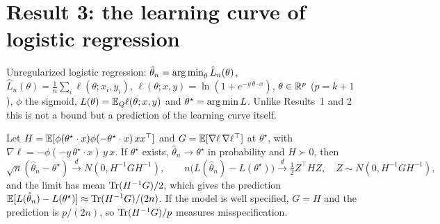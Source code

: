 \section{Result 3: the learning curve of logistic regression}
\label{sec:result-3}

Unregularized logistic regression: $\hat\theta_n=\operatorname*{arg\,min}_\theta\hat L_n(\theta)$,
$\hat L_n(\theta)=\frac1n\sum_i\ell(\theta;x_i,y_i)$, $\ell(\theta;x,y)=\ln(1+e^{-y\,\theta\cdot x})$,
$\theta\in\mathbb{R}^p$ ($p=k+1$), $\phi$ the sigmoid, $L(\theta)=\mathbb{E}_Q\ell(\theta;x,y)$ and
$\theta^\star=\operatorname*{arg\,min} L$. Unlike Results~1 and 2 this is not a bound but a prediction of the
learning curve itself.

\begin{theorem}[Result 3]
\label{thm:3}
Let $H=\mathbb{E}[\phi(\theta^\star\cdot x)\phi(-\theta^\star\cdot x)\,xx^\top]$ and $G=\mathbb{E}[\nabla\ell\,\nabla\ell^\top]$
at $\theta^\star$, with $\nabla\ell=-\phi(-y\,\theta^\star\cdot x)\,y\,x$. If $\theta^\star$ exists,
$\hat\theta_n\to\theta^\star$ in probability and $H\succ0$, then
\[ \sqrt n(\hat\theta_n-\theta^\star)\xrightarrow{d}N(0,H^{-1}GH^{-1}),\qquad
   n\bigl(L(\hat\theta_n)-L(\theta^\star)\bigr)\xrightarrow{d}\tfrac12Z^\top HZ,\quad Z\sim N(0,H^{-1}GH^{-1}), \]
and the limit has mean $\operatorname{Tr}(H^{-1}G)/2$, which gives the prediction
$\mathbb{E}[L(\hat\theta_n)-L(\theta^\star)]\approx\operatorname{Tr}(H^{-1}G)/(2n)$. If the model is well specified,
$G=H$ and the prediction is $p/(2n)$, so $\operatorname{Tr}(H^{-1}G)/p$ measures misspecification.
\end{theorem}


